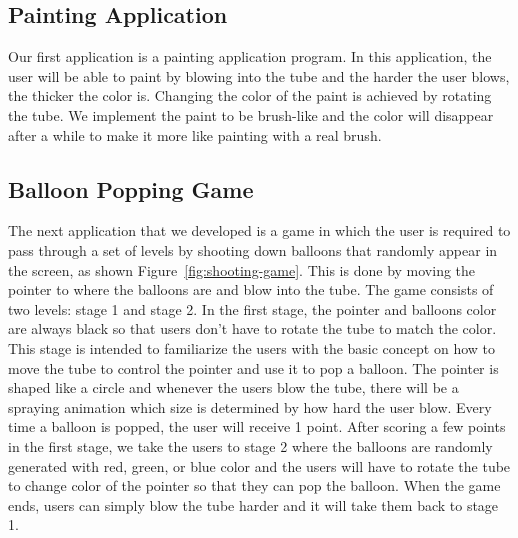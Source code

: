 \subsection{\textbf{Painting Application}}


Our first application is a painting application program. In this application, the user will be able to paint by blowing into the tube and the harder the user blows, the thicker the color is. Changing the color of the paint is achieved by rotating the tube. We implement the paint to be brush-like and the color will disappear after a while to make it more like painting with a real brush.

\subsection{\textbf{Balloon Popping Game}}

The next application that we developed is a game in which the user is required to pass through a set of levels by shooting down balloons that randomly appear in the screen, as shown Figure~\ref{fig:shooting-game}. This is done by moving the pointer to where the balloons are and blow into the tube. The game consists of two levels: stage 1 and stage 2. In the first stage, the pointer and balloons color are always black so that users don’t have to rotate the tube to match the color. This stage is intended to familiarize the users with the basic concept on how to move the tube to control the pointer and use it to pop a balloon. The pointer is shaped like a circle and whenever the users blow the tube, there will be a spraying animation which size is determined by how hard the user blow. Every time a balloon is popped, the user will receive 1 point. After scoring a few points in the first stage, we take the users to stage 2 where the balloons are randomly generated with red, green, or blue color and the users will have to rotate the tube to change color of the pointer so that they can pop the balloon. When the game ends, users can simply blow the tube harder and it will take them back to stage 1.

